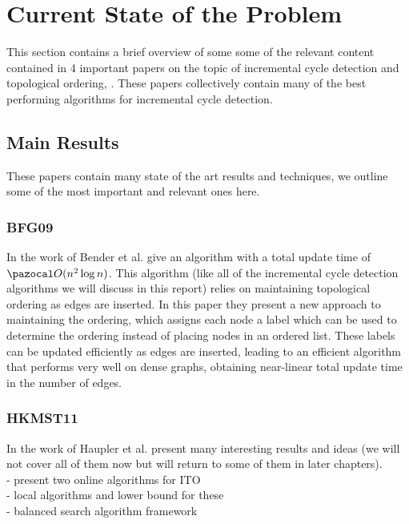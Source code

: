 \documentclass{report}
\begin{document}
\section{Current State of the Problem}

This section contains a brief overview of some some of the relevant content contained in 4 important papers on the topic of incremental cycle detection and topological ordering, \cite{BenderFG09, HaeuplerKMST12, BernsteinC18, BhattacharyaK20}. These papers collectively contain many of the best performing algorithms for incremental cycle detection.

\subsection{Main Results}

These papers contain many state of the art results and techniques, we outline some of the most important and relevant ones here.

\subsubsection{BFG09}

In the work of \cite{BenderFG09} Bender et al. give an algorithm with a total update time of $\pazocal O(n^2 \log n)$. This algorithm (like all of the incremental cycle detection algorithms we will discuss in this report) relies on maintaining topological ordering as edges are inserted. In this paper they present a new approach to maintaining the ordering, which assigns each node a label which can be used to determine the ordering instead of placing nodes in an ordered list. These labels can be updated efficiently as edges are inserted, leading to an efficient algorithm that performs very well on dense graphs, obtaining near-linear total update time in the number of edges.

\subsubsection{HKMST11}

In the work of \cite{HaeuplerKMST12} Haupler et al. present many interesting results and ideas (we will not cover all of them now but will return to some of them in later chapters).\\
- present two online algorithms for ITO\\
- local algorithms and lower bound for these\\
- balanced search algorithm framework
\end{document}
